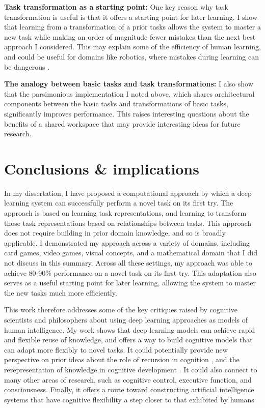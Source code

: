 \documentclass[12pt]{article}
\begin{document}
\textbf{Task transformation as a starting point:} One key reason why task transformation is useful is that it offers a starting point for later learning. I show that learning from a transformation of a prior tasks allows the system to master a new task while making an order of magnitude fewer mistakes than the next best approach I considered. This may explain some of the efficiency of human learning, and could be useful for domains like robotics, where mistakes during learning can be dangerous \citep{Turchetta2016}.  

\textbf{The analogy between basic tasks and task transformations:} I also show that the parsimonious implementation I noted above, which shares architectural components between the basic tasks and transformations of basic tasks, significantly improves performance. This raises interesting questions about the benefits of a shared workspace that may provide interesting ideas for future research.

\section{Conclusions \& implications}

In my dissertation, I have proposed a computational approach by which a deep learning system can successfully perform a novel task on its first try. The approach is based on learning task representations, and learning to transform those task representations based on relationships between tasks. This approach does not require building in prior domain knowledge, and so is broadly applicable. I demonstrated my approach across a variety of domains, including card games, video games, visual concepts, and a mathematical domain that I did not discuss in this summary. Across all these settings, my approach was able to achieve 80-90\% performance on a novel task on its first try. This adaptation also serves as a useful starting point for later learning, allowing the system to master the new tasks much more efficiently. 

This work therefore addresses some of the key critiques raised by cognitive scientists and philosophers about using deep learning approaches as models of human intelligence. My work shows that deep learning models can achieve rapid and flexible reuse of knowledge, and offers a way to build cognitive models that can adapt more flexibly to novel tasks. It could potentially provide new perspective on prior ideas about the role of recursion in cognition \citep{Fodor2008lot2}, and the rerepresentation of knowledge in cognitive development \citep{Karmiloff-Smith1986}. It could also connect to many other areas of research, such as cognitive control, executive function, and consciousness. Finally, it offers a route toward constructing artificial intelligence systems that have cognitive flexibility a step closer to that exhibited by humans 



\end{document}
